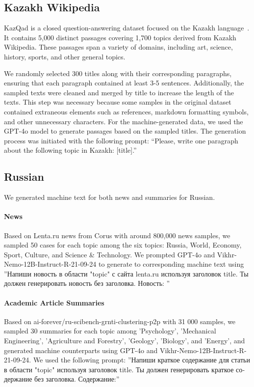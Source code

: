 \subsection{Kazakh Wikipedia}
KazQad is a closed question-answering dataset focused on the Kazakh language~\citep{kazqad}. It contains 5,000 distinct passages covering 1,700 topics derived from Kazakh Wikipedia. These passages span a variety of domains, including art, science, history, sports, and other general topics.
 
We randomly selected 300 titles along with their corresponding paragraphs, ensuring that each paragraph contained at least 3-5 sentences. Additionally, the sampled texts were cleaned and merged by title to increase the length of the texts. This step was necessary because some samples in the original dataset contained extraneous elements such as references, markdown formatting symbols, and other unnecessary characters.
For the machine-generated data, we used the GPT-4o model to generate passages based on the sampled titles. The generation process was initiated with the following prompt: ``Please, write one paragraph about the following topic in Kazakh: [title].''





\subsection{Russian}
We generated machine text for both news and summaries for Russian.

\paragraph{News}
Based on Lenta.ru news from Corus with around 800,000 news samples, we sampled 50 cases for each topic among the six topics: Russia, World, Economy, Sport, Culture, and Science \& Technology. We prompted GPT-4o and Vikhr-Nemo-12B-Instruct-R-21-09-24 to generate to corresponding machine text using \foreignlanguage{russian}{''Напиши новость в области "{topic}" с сайта lenta.ru используя заголовок {title}. Ты должен генерировать новость без заголовка. Новость: ''}

\paragraph{Academic Article Summaries} 
Based on ai-forever/ru-scibench-grnti-clustering-p2p with 31 000 samples, we sampled 30 summaries for each topic among 'Psychology', 'Mechanical Engineering', 'Agriculture and Forestry', 'Geology', 'Biology', and 'Energy', and generated machine counterparts using GPT-4o and Vikhr-Nemo-12B-Instruct-R-21-09-24.  
We used the following prompt: \foreignlanguage{russian}{''Напиши краткое содержание для статьи в области "{topic}" используя заголовок {title}. Ты должен генерировать краткое содержание без заголовка. Содержание:''}



